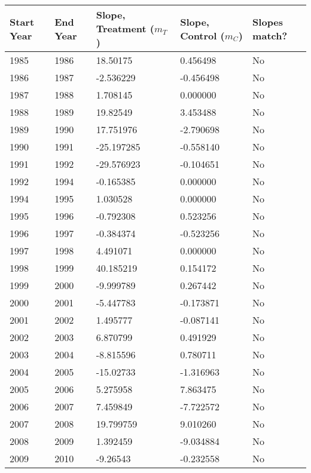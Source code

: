 \begin{longtable}{|p{1.2cm}|p{1.2cm}|p{2.2cm}|p{2cm}|p{1.5cm}|}
\centering
\textbf{Start Year} & \textbf{End Year} & \textbf{Slope, Treatment (\({m_T}\)) } & \textbf{Slope, Control (\({m_C}\))} & \textbf{Slopes match?}\\
\hline
1985\rule{0pt}{4ex} & 1986 & 18.50175 & 0.456498 & No\\
1986\rule{0pt}{4ex} & 1987 & -2.536229 & -0.456498 & No\\
1987\rule{0pt}{4ex} & 1988 & 1.708145 & 0.000000 & No\\
1988\rule{0pt}{4ex} & 1989 & 19.82549 & 3.453488 & No\\
1989\rule{0pt}{4ex} & 1990 & 17.751976 & -2.790698 & No\\
1990\rule{0pt}{4ex} & 1991 & -25.197285 & -0.558140 & No\\
1991\rule{0pt}{4ex} & 1992 & -29.576923 & -0.104651 & No\\
1992\rule{0pt}{4ex} & 1994 & -0.165385 & 0.000000 & No\\
1994\rule{0pt}{4ex} & 1995 & 1.030528 & 0.000000 & No\\
1995\rule{0pt}{4ex} & 1996 & -0.792308 & 0.523256 & No\\
1996\rule{0pt}{4ex} & 1997 & -0.384374 & -0.523256 & No\\
1997\rule{0pt}{4ex} & 1998 & 4.491071 & 0.000000 & No\\
1998\rule{0pt}{4ex} & 1999 & 40.185219 & 0.154172 & No\\
1999\rule{0pt}{4ex} & 2000 & -9.999789 & 0.267442 & No\\
2000\rule{0pt}{4ex} & 2001 & -5.447783 & -0.173871 & No\\
2001\rule{0pt}{4ex} & 2002 & 1.495777 & -0.087141 & No\\
2002\rule{0pt}{4ex} & 2003 & 6.870799 & 0.491929 & No\\
2003\rule{0pt}{4ex} & 2004 & -8.815596 & 0.780711 & No\\
2004\rule{0pt}{4ex} & 2005 & -15.02733 & -1.316963 & No\\
2005\rule{0pt}{4ex} & 2006 & 5.275958 & 7.863475 & No\\
2006\rule{0pt}{4ex} & 2007 & 7.459849 & -7.722572 & No\\
2007\rule{0pt}{4ex} & 2008 & 19.799759 & 9.010260 & No\\
2008\rule{0pt}{4ex} & 2009 & 1.392459 & -9.034884 & No\\
2009\rule{0pt}{4ex} & 2010 & -9.26543 & -0.232558 & No\\

\end{longtable}
